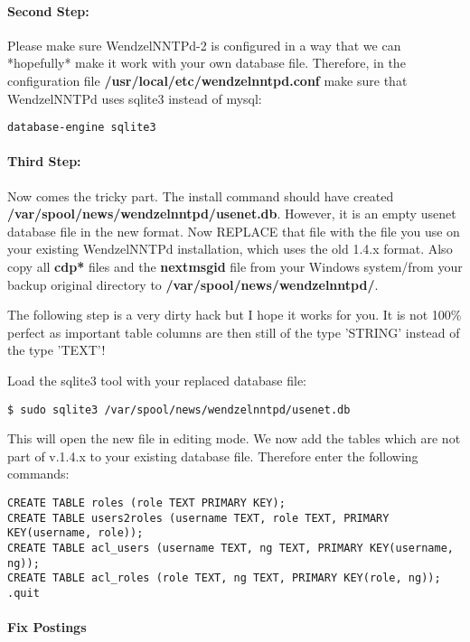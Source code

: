 \paragraph*{Second Step:} Please make sure WendzelNNTPd-2 is configured in a way that we can *hopefully* make it work with your own database file. Therefore, in the configuration file {\bf /usr/local/etc/wendzelnntpd.conf} make sure that WendzelNNTPd uses sqlite3 instead of mysql:

\begin{verbatim}
database-engine sqlite3
\end{verbatim}

\paragraph*{Third Step:}
Now comes the tricky part. The install command should have created
{\bf /var/spool/news/wendzelnntpd/usenet.db}.
However, it is an empty usenet database file in the new format.
Now REPLACE that file with the file you use on your existing WendzelNNTPd installation, which uses the old 1.4.x format. Also copy all {\bf cdp*} files and the {\bf nextmsgid} file from your Windows system/from your backup original directory to {\bf /var/spool/news/wendzelnntpd/}. 

The following step is a very dirty hack but I hope it works for you. It is not 100\% perfect as important table columns are then still of the type 'STRING' instead of the type 'TEXT'!

Load the sqlite3 tool with your replaced database file:

\begin{verbatim}
$ sudo sqlite3 /var/spool/news/wendzelnntpd/usenet.db
\end{verbatim}

This will open the new file in editing mode. We now add the tables which are not part of v.1.4.x to your existing database file. Therefore enter the following commands:

\begin{verbatim}
CREATE TABLE roles (role TEXT PRIMARY KEY);
CREATE TABLE users2roles (username TEXT, role TEXT, PRIMARY KEY(username, role));
CREATE TABLE acl_users (username TEXT, ng TEXT, PRIMARY KEY(username, ng));
CREATE TABLE acl_roles (role TEXT, ng TEXT, PRIMARY KEY(role, ng));
.quit
\end{verbatim}


\paragraph*{Fix Postings}


